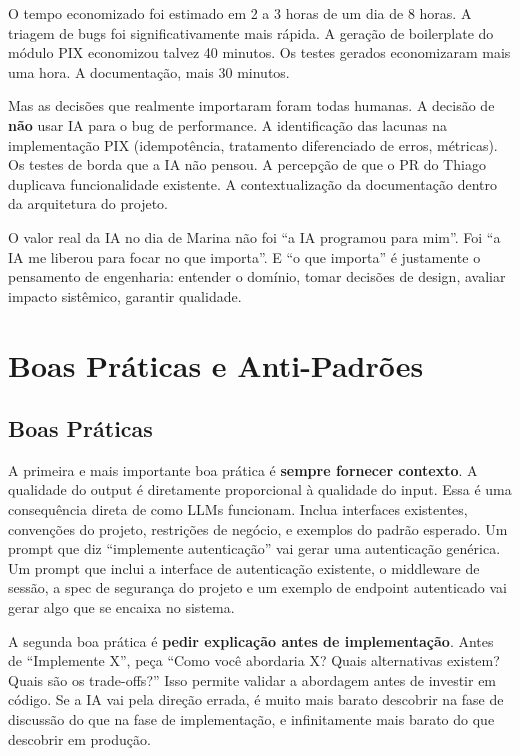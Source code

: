 O tempo economizado foi estimado em 2 a 3 horas de um dia de 8 horas. A triagem de
bugs foi significativamente mais rápida. A geração de boilerplate do módulo PIX economizou
talvez 40 minutos. Os testes gerados economizaram mais uma hora. A documentação, mais
30 minutos.

Mas as decisões que realmente importaram foram todas humanas. A decisão de \textbf{não}
usar IA para o bug de performance. A identificação das lacunas na implementação PIX
(idempotência, tratamento diferenciado de erros, métricas). Os testes de borda que a
IA não pensou. A percepção de que o PR do Thiago duplicava funcionalidade existente. A
contextualização da documentação dentro da arquitetura do projeto.

O valor real da IA no dia de Marina não foi ``a IA programou para mim''. Foi ``a
IA me liberou para focar no que importa''. E ``o que importa'' é justamente o
pensamento de engenharia: entender o domínio, tomar decisões de design, avaliar
impacto sistêmico, garantir qualidade.

\section{Boas Práticas e Anti-Padrões}

\subsection{Boas Práticas}

A primeira e mais importante boa prática é \textbf{sempre fornecer contexto}. A
qualidade do output é diretamente proporcional à qualidade do input. Essa é uma
consequência direta de como LLMs funcionam. Inclua interfaces
existentes, convenções do projeto, restrições de negócio, e exemplos do padrão
esperado. Um prompt que diz ``implemente autenticação'' vai gerar uma autenticação
genérica. Um prompt que inclui a interface de autenticação existente, o middleware
de sessão, a spec de segurança do projeto e um exemplo de endpoint autenticado vai
gerar algo que se encaixa no sistema.

A segunda boa prática é \textbf{pedir explicação antes de implementação}. Antes de
``Implemente X'', peça ``Como você abordaria X? Quais alternativas existem? Quais são
os trade-offs?'' Isso permite validar a abordagem antes de investir em código. Se a IA
vai pela direção errada, é muito mais barato descobrir na fase de discussão do que na
fase de implementação, e infinitamente mais barato do que descobrir em produção.

